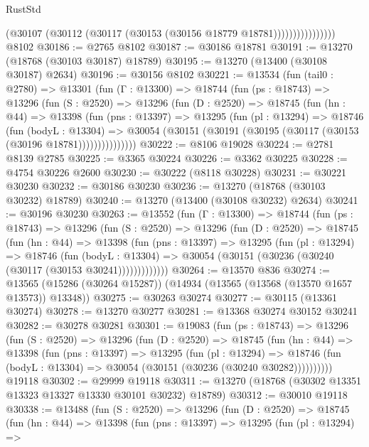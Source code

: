 \begin{lexlean}{RustStd}
\begin{coremodule}
                          (@30107 (@30112 (@30117 (@30153 (@30156 @18779 @18781))))))))))))))))
    @8102
@30186 := @2765 @8102
@30187 := @30186 @18781
@30191 := @13270 (@18768 (@30103 @30187) @18789)
@30195 := @13270 (@13400 (@30108 @30187) @2634)
@30196 := @30156 @8102
@30221 := @13534
    (fun (tail0 : @2780) =>
    @13301
      (fun (Γ : @13300) =>
      @18744
        (fun (ps : @18743) =>
        @13296
          (fun (S : @2520) =>
          @13296
            (fun (D : @2520) =>
            @18745
              (fun (hn : @44) =>
              @13398
                (fun (pns : @13397) =>
                @13295
                  (fun (pl : @13294) =>
                  @18746
                    (fun (bodyL : @13304) =>
                    @30054 (@30151 (@30191 (@30195 (@30117 (@30153 (@30196 @18781)))))))))))))))
@30222 := @8106 @19028
@30224 := @2781 @8139 @2785
@30225 := @3365 @30224
@30226 := @3362 @30225
@30228 := @4754 @30226 @2600
@30230 := @30222 (@8118 @30228)
@30231 := @30221 @30230
@30232 := @30186 @30230
@30236 := @13270 (@18768 (@30103 @30232) @18789)
@30240 := @13270 (@13400 (@30108 @30232) @2634)
@30241 := @30196 @30230
@30263 := @13552
    (fun (Γ : @13300) =>
    @18744
      (fun (ps : @18743) =>
      @13296
        (fun (S : @2520) =>
        @13296
          (fun (D : @2520) =>
          @18745
            (fun (hn : @44) =>
            @13398
              (fun (pns : @13397) =>
              @13295
                (fun (pl : @13294) =>
                @18746
                  (fun (bodyL : @13304) =>
                  @30054 (@30151 (@30236 (@30240 (@30117 (@30153 @30241)))))))))))))
@30264 := @13570 @836
@30274 := @13565 (@15286 (@30264 @15287)) (@14934 (@13565 (@13568 (@13570 @1657 @13573)) @13348))
@30275 := @30263 @30274
@30277 := @30115 (@13361 @30274)
@30278 := @13270 @30277
@30281 := @13368 @30274 @30152 @30241
@30282 := @30278 @30281
@30301 := @19083
    (fun (ps : @18743) =>
    @13296
      (fun (S : @2520) =>
      @13296
        (fun (D : @2520) =>
        @18745
          (fun (hn : @44) =>
          @13398
            (fun (pns : @13397) =>
            @13295
              (fun (pl : @13294) =>
              @18746 (fun (bodyL : @13304) => @30054 (@30151 (@30236 (@30240 @30282))))))))))
    @19118
@30302 := @29999 @19118
@30311 := @13270 (@18768 (@30302 @13351 @13323 @13327 @13330 @30101 @30232) @18789)
@30312 := @30010 @19118
@30338 := @13488
    (fun (S : @2520) =>
    @13296
      (fun (D : @2520) =>
      @18745
        (fun (hn : @44) =>
        @13398
          (fun (pns : @13397) =>
          @13295
            (fun (pl : @13294) =>

\end{coremodule}
\end{lexlean}
